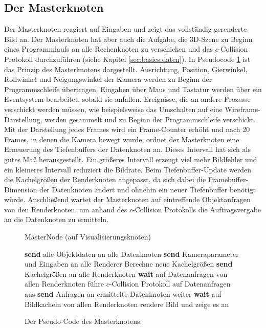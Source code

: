 \subsection{Der Masterknoten}
\label{sec:impl:master}
Der Masterknoten reagiert auf Eingaben und zeigt das vollständig gerenderte Bild an. Der Masterknoten hat aber auch die Aufgabe, die 3D-Szene zu Beginn eines Programmlaufs an alle Rechenknoten zu verschicken und das $c$-Collision Protokoll durchzuführen (siehe Kapitel \ref{sec:basics:daten}). In Pseudocode \ref{alg:impl:masternode} ist das Prinzip des Masterknotens dargestellt. Ausrichtung, Position, Gierwinkel, Rollwinkel und Neigungswinkel der Kamera werden zu Beginn der Programmschleife übertragen. Eingaben über Maus und Tastatur werden über ein Eventsystem bearbeitet, sobald sie anfallen. Ereignisse, die an andere Prozesse verschickt werden müssen, wie beispielsweise das Umschalten auf eine Wireframe-Darstellung, werden gesammelt und zu Beginn der Programmschleife verschickt. Mit der Darstellung jedes Frames wird ein Frame-Counter erhöht und nach 20 Frames, in denen die Kamera bewegt wurde, ordnet der Masterknoten eine Erneuerung des Tiefenbuffers der Datenknoten an. Dieses Intervall hat sich als gutes Maß herausgestellt. Ein größeres Intervall erzeugt viel mehr Bildfehler und ein kleineres Intervall reduziert die Bildrate. Beim Tiefenbuffer-Update werden die Kachelgrößen der Renderknoten angepasst, da sich dabei die Framebuffer-Dimension der Datenknoten ändert und ohnehin ein neuer Tiefenbuffer benötigt würde. Anschließend wartet der Masterknoten auf eintreffende Objektanfragen von den Renderknoten, um anhand des $c$-Collision Protokolls die Auftragsvergabe an die Datenknoten zu ermitteln.
\begin{figure}[ttt!]
\centering
 \begin{minipage}[t]{13cm}
\begin{algorithm}[H]
  \caption{MasterNode (auf Visualisierungsknoten)\label{alg:impl:masternode}} 
    \begin{algorithmic} [1]
      \STATE \textbf{send} alle Objektdaten an alle Datenknoten
	\STATE \textbf{send} Kameraparameter und Eingaben an alle Renderer
	  \STATE Berechne neue Kachelgrößen
	  \STATE \textbf{send} Kachelgrößen an alle Renderknoten
	\ENDIF
	\STATE \textbf{wait} auf Datenanfragen von allen Renderknoten
	\STATE führe $c$-Collision Protokoll auf Datenanfragen aus
	\STATE \textbf{send} Anfragen an ermittelte Datenknoten weiter
	\STATE \textbf{wait} auf Bildkacheln von allen Renderknoten
	\STATE rendere Bild und zeige es an
      \ENDWHILE
    \end{algorithmic}
\end{algorithm}
 \end{minipage}
\caption{Der Pseudo-Code des Masterknotens.}
\end{figure}

